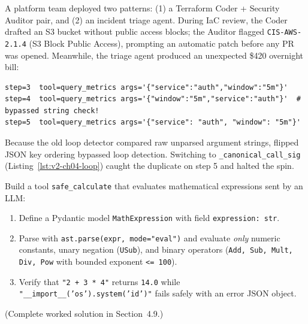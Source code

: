 \begin{realworldbox}
A platform team deployed two patterns: (1) a Terraform Coder + Security Auditor pair, and (2) an incident triage agent. During IaC review, the Coder drafted an S3 bucket without public access blocks; the Auditor flagged \texttt{CIS-AWS-2.1.4} (S3 Block Public Access), prompting an automatic patch before any PR was opened. Meanwhile, the triage agent produced an unexpected \$420 overnight bill:
\begin{lstlisting}[basicstyle=\ttfamily\scriptsize]
step=3  tool=query_metrics args='{"service":"auth","window":"5m"}'
step=4  tool=query_metrics args='{"window":"5m","service":"auth"}'  # bypassed string check!
step=5  tool=query_metrics args='{"service": "auth", "window": "5m"}'
\end{lstlisting}
Because the old loop detector compared raw unparsed argument strings, flipped JSON key ordering bypassed loop detection. Switching to \texttt{\_canonical\_call\_sig} (Listing~\ref{lst:v2-ch04-loop}) caught the duplicate on step 5 and halted the spin.
\end{realworldbox}

\begin{tryityourselfbox}
Build a tool \texttt{safe\_calculate} that evaluates mathematical expressions sent by an LLM:
\begin{enumerate}
  \item Define a Pydantic model \texttt{MathExpression} with field \texttt{expression: str}.
  \item Parse with \texttt{ast.parse(expr, mode="eval")} and evaluate \emph{only} numeric constants, unary negation (\texttt{USub}), and binary operators (\texttt{Add, Sub, Mult, Div, Pow} with bounded exponent \texttt{<= 100}).
  \item Verify that \texttt{"2 + 3 * 4"} returns \texttt{14.0} while \texttt{"\_\_import\_\_('os').system('id')"} fails safely with an error JSON object.
\end{enumerate}
(Complete worked solution in Section~4.9.)
\end{tryityourselfbox}

